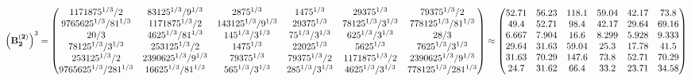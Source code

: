 \documentclass[10pt,a4paper]{article}
\begin{document}
	\[
		\left(\bold{B_2^{(2)}}\right)^{3} = 
		\begin{pmatrix}
			{{1171875^ {1 / 3}}} / {{2}} & {{8}{3125^ {1 / 3}}} / {{9^ {1 / 3}}} & {{28}{75^ {1 / 3}}}{} & {{14}{75^ {1 / 3}}}{} & {{2}{9375^ {1 / 3}}}{} & {{7}{9375^ {1 / 3}}} / {{2}} \\
			{{9765625^ {1 / 3}}} / {{81^ {1 / 3}}} & {{1171875^ {1 / 3}}} / {{2}} & {{14}{3125^ {1 / 3}}} / {{9^ {1 / 3}}} & {{2}{9375^ {1 / 3}}}{} & {{78125^ {1 / 3}}} / {{3^ {1 / 3}}} & {{7}{78125^ {1 / 3}}} / {{81^ {1 / 3}}} \\
			{{20}} / {{3}} & {{4}{625^ {1 / 3}}} / {{81^ {1 / 3}}} & {{14}{5^ {1 / 3}}} / {{3^ {1 / 3}}} & {{7}{5^ {1 / 3}}} / {{3^ {1 / 3}}} & {{625^ {1 / 3}}} / {{3^ {1 / 3}}} & {{28}} / {{3}} \\
			{{78125^ {1 / 3}}} / {{3^ {1 / 3}}} & {{253125^ {1 / 3}}} / {{2}} & {{14}{75^ {1 / 3}}}{} & {{2}{2025^ {1 / 3}}}{} & {{5625^ {1 / 3}}}{} & {{7}{625^ {1 / 3}}} / {{3^ {1 / 3}}} \\
			{{253125^ {1 / 3}}} / {{2}} & {{2}{390625^ {1 / 3}}} / {{9^ {1 / 3}}} & {{7}{9375^ {1 / 3}}}{} & {{7}{9375^ {1 / 3}}} / {{2}} & {{1171875^ {1 / 3}}} / {{2}} & {{2}{390625^ {1 / 3}}} / {{9^ {1 / 3}}} \\
			{{9765625^ {1 / 3}}} / {{2}{81^ {1 / 3}}} & {{16}{625^ {1 / 3}}} / {{81^ {1 / 3}}} & {{56}{5^ {1 / 3}}} / {{3^ {1 / 3}}} & {{28}{5^ {1 / 3}}} / {{3^ {1 / 3}}} & {{4}{625^ {1 / 3}}} / {{3^ {1 / 3}}} & {{7}{78125^ {1 / 3}}} / {{2}{81^ {1 / 3}}} \\
		\end{pmatrix}
		\approx
		\begin{pmatrix}
			52.71    & 56.23    & 118.1    & 59.04    & 42.17    & 73.8     \\
			49.4     & 52.71    & 98.4     & 42.17    & 29.64    & 69.16    \\
			6.667    & 7.904    & 16.6     & 8.299    & 5.928    & 9.333    \\
			29.64    & 31.63    & 59.04    & 25.3     & 17.78    & 41.5     \\
			31.63    & 70.29    & 147.6    & 73.8     & 52.71    & 70.29    \\
			24.7     & 31.62    & 66.4     & 33.2     & 23.71    & 34.58    \\
		\end{pmatrix}
	\]
\end{document}
